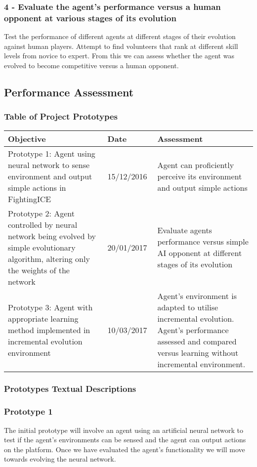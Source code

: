 \documentclass[12pt,a4paper]{article}
\begin{document}
\subsubsection*{4 - Evaluate the agent's performance versus a human opponent at various stages of its evolution}
Test the performance of different agents at different stages of their evolution against human players. Attempt to find volunteers that rank at different skill levels from novice to expert. From this we can assess whether the agent was evolved to become competitive versus a human opponent.

\newpage
\subsection{Performance Assessment}
\subsubsection{Table of Project Prototypes}
\begin{tabular}{|p{0.4\linewidth}|p{0.2\linewidth}|p{0.4\linewidth}|}
\hline
Objective & Date & Assessment\\ \hline
Prototype 1: Agent using neural network to sense environment and output simple actions in FightingICE & 15/12/2016 & Agent can proficiently perceive its environment and output simple actions\\ \hline
Prototype 2: Agent controlled by neural network being evolved by simple evolutionary algorithm, altering only the weights of the network & 20/01/2017 & Evaluate agents performance versus simple AI opponent at different stages of its evolution\\ \hline
Prototype 3: Agent with appropriate learning method implemented in incremental evolution environment & 10/03/2017 & Agent's environment is adapted to utilise incremental evolution. Agent's performance assessed and compared versus learning without incremental environment.\\ \hline
\end{tabular}
\newpage
\subsubsection{Prototypes Textual Descriptions}
\subsubsection*{Prototype 1}
The initial prototype will involve an agent using an artificial neural network to test if the agent's environments can be sensed and the agent can output actions on the platform. Once we have evaluated the agent's functionality we will move towards evolving the neural network.
\end{document}
